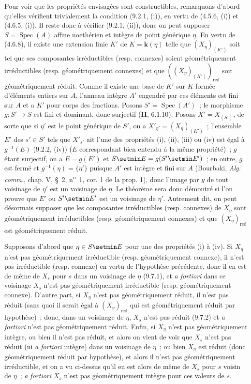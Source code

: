 Pour voir que les propriétés envisagées sont constructibles, remarquons d'abord
qu'elles vérifient trivialement la condition (9.2.1, (i)), en vertu de
(4.5.6, (i)) et (4.6.5, (i)). Il reste donc à vérifier (9.2.1, (ii)), donc on
peut supposer $S=\operatorname{Spec}(A)$ affine noethérien et intègre de point
générique $\eta$. En vertu de (4.6.8), il existe une extension finie $K'$ de
$K=\boldsymbol{k}(\eta)$ telle que $(X_\eta)_{(K')}$ soit tel que ses
composantes irréductibles (resp. connexes) soient géométriquement irréductibles
(resp. géométriquement connexes) et que $((X_\eta)_{(K')})_{\mathrm{red}}$ soit
géométriquement réduit. Comme il existe une base de $K'$ sur $K$ formée
d'éléments entiers sur $A$, l'anneau intègre $A'$ engendré par ces éléments est
fini sur $A$ et a $K'$ pour corps des fractions. Posons
$S'=\operatorname{Spec}(A')$~; le morphisme $g:S'\to S$ est fini et dominant,
donc surjectif (\textbf{II}, 6.1.10). Posons $X'=X_{(S')}$, de sorte que si
$\eta'$ est le point générique de $S'$, on a
$X'_{\eta'}=(X_\eta)_{(K')}$~; l'ensemble $E'$ des $s'\in S'$ tels que
$X'_{s'}$ ait l'une des propriétés (i), (ii), (iii) ou (iv) est égal à
$g^{-1}(E)$ (9.2.2, (iv)) ($E$ correspondant bien entendu à la même propriété)~;
$g$ étant surjectif, on a $E=g(E')$ et $S\setmin E=g(S'\setmin E')$~; en outre, $g$ est fermé
et $g^{-1}(\eta)=\{\eta'\}$ puisque $A'$ est intègre et fini sur $A$ (Bourbaki,
\emph{Alg. comm.}, chap. V, \S~2, n\textsuperscript{o}~1, cor. 1 de la prop. 1), donc
l'image par $g$ de tout voisinage de $\eta'$ est un voisinage de $\eta$. Le
théorème sera donc démontré si l'on prouve que $E'$ ou $S'\setmin E'$ est un voisinage
de $\eta'$. Autrement dit, on peut désormais supposer que les composantes
irréductibles (resp. connexes) de $X_\eta$ sont géométriquement
irréductibles (resp. géométriquement connexes) et que $(X_\eta)_{\mathrm{red}}$
est géométriquement réduit.

Supposons d'abord que $\eta\in S\setmin E$ pour une des propriétés (i) à (iv). Si
$X_\eta$ n'est pas géométriquement irréductible (resp. géométriquement connexe),
il n'est pas irréductible (resp. connexe) en vertu de l'hypothèse précédente,
donc il en est de même de $X_s$ pour $s$ dans un voisinage de $\eta$ (9.7.1), et
\emph{a fortiori} dans ce voisinage $X_s$ n'est pas géométriquement irréductible
(resp. géométriquement connexe). D'autre part, si $X_\eta$ n'est pas
géométriquement réduit, il n'est pas réduit (sans quoi il serait égal à
$(X_\eta)_{\mathrm{red}}$ qui est géométriquement réduit par hypothèse)~; donc,
dans un voisinage de $\eta$, $X_s$ n'est pas réduit (9.7.2) et \emph{a fortiori}
n'est pas géométriquement réduit. Enfin, si $X_\eta$ n'est pas géométriquement
intègre, ou bien il n'est pas réduit, et alors on vient de voir que $X_s$ n'est
pas réduit (ni \emph{a fortiori} intègre) dans un voisinage de $\eta$~; ou bien
$X_\eta$ est réduit (donc géométriquement réduit par hypothèse), et alors il
n'est pas géométriquement irréductible, et on a vu ci-dessus qu'il en est alors
de même de $X_s$ pour $s$ voisin de $\eta$~; \emph{a fortiori} $X_s$ n'est pas
géométriquement intègre pour ces valeurs de $s$.

